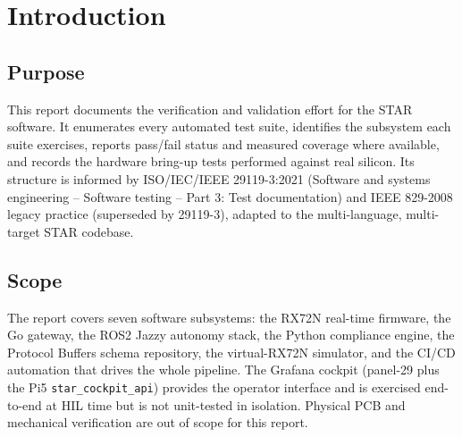 \documentclass[11pt,letterpaper]{article}
\begin{document}
\setcounter{page}{1}
\tableofcontents
\clearpage
\listoffigures
\listoftables
\clearpage

\setcounter{page}{1}

\section{Introduction}
\label{sec:intro}

\subsection{Purpose}
This report documents the verification and validation effort for the
STAR software. It enumerates every automated test suite, identifies
the subsystem each suite exercises, reports pass/fail status and
measured coverage where available, and records the hardware
bring-up tests performed against real silicon. Its structure is
informed by ISO/IEC/IEEE 29119-3:2021 (Software and systems
engineering -- Software testing -- Part 3: Test documentation) and
IEEE 829-2008 legacy practice (superseded by 29119-3), adapted to
the multi-language, multi-target STAR codebase.

\subsection{Scope}
The report covers seven software subsystems: the RX72N real-time
firmware, the Go gateway, the ROS2 Jazzy autonomy stack, the
Python compliance engine, the Protocol Buffers schema repository, the
virtual-RX72N simulator, and the CI/CD automation that drives the
whole pipeline. The Grafana cockpit (panel-29 plus the Pi5
\texttt{star\_cockpit\_api}) provides the operator interface and is
exercised end-to-end at HIL time but is not unit-tested in isolation.
Physical PCB and mechanical verification are out of scope for this
report.
\end{document}
